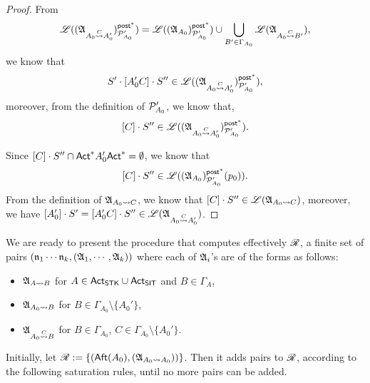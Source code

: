 {\begin{proof}
    From $${\mathscr{L} }(({\mathfrak{A} }_{A_0\stackrel{C}\rightsquigarrow A_0'})^{{\mathsf{post} }^*}_{{\mathcal{P} }'_{A_0}}) = {\mathscr{L} }(({\mathfrak{A} }_{A_0})^{{\mathsf{post} }^*}_{{\mathcal{P} }'_{A_0}})\cup\bigcup\limits_{B'\in\Gamma_{A_0}}{\mathscr{L} }({\mathfrak{A} }_{A_0\stackrel{C}\rightsquigarrow B'}),$$
    we know that
    $$S'\cdot[A_0'C]\cdot S''\in {\mathscr{L} }(({\mathfrak{A} }_{A_0\stackrel{C}\rightsquigarrow A_0'})^{{\mathsf{post} }^*}_{{\mathcal{P} }'_{A_0}}),$$
    moreover, from the definition of ${\mathcal{P} }'_{A_0}$, we know that,
    $$[C]\cdot S''\in {\mathscr{L} }(({\mathfrak{A} }_{A_0\stackrel{C}\rightsquigarrow A_0'})^{{\mathsf{post} }^*}_{{\mathcal{P} }'_{A_0}}).$$

    Since $[C]\cdot S''\cap {\sf Act}^*A_0'{\sf Act}^* = \emptyset$, we know that $$[C]\cdot S''\in {\mathscr{L} }(({\mathfrak{A} }_{A_0})^{{\mathsf{post} }^*}_{{\mathcal{P} }'_{A_0}}(p_0)).$$
    From the definition of ${\mathfrak{A} }_{A_0\rightsquigarrow C}$, we know that $[C]\cdot S''\in {\mathscr{L} }({\mathfrak{A} }_{A_0\rightsquigarrow C})$,
    moreover, we have $[A_0']\cdot S' = [A_0'C]\cdot S''\in {\mathscr{L} }({\mathfrak{A} }_{A_0\stackrel{C}\rightsquigarrow A_0'})$.
\end{proof}
}

We are ready to present the procedure that computes effectively $\mathscr{R}$, a finite set of pairs $(\mathfrak{n}_1\cdots\mathfrak{n}_k,({\mathfrak{A} }_1,\cdots,{\mathfrak{A} }_k))$ where each of ${\mathfrak{A} }_i$'s are of the forms as follows:
\begin{itemize}
    \item ${\mathfrak{A} }_{A\rightsquigarrow B}$ for $A\in{\sf Act}_{\mathsf{STK}}\cup{\sf Act}_{\mathsf{SIT}}$ and $B\in\Gamma_A$,
    \item ${\mathfrak{A} }_{A_0\rightsquigarrow B}$ for $B\in\Gamma_{A_0}\setminus\{A_0'\}$,
    \item ${\mathfrak{A} }_{A_0\stackrel{C}\rightsquigarrow B}$ for $B\in\Gamma_{A_0}$, $C\in\Gamma_{A_0}\setminus\{A_0'\}$.
\end{itemize}
Initially, let $\mathscr{R} := \{({\sf Aft}(A_0),({\mathfrak{A} }_{A_0\rightsquigarrow A_0}))\}$.
Then it adds pairs to $\mathscr{R}$, according to the following saturation rules, until no more pairs can be added.

